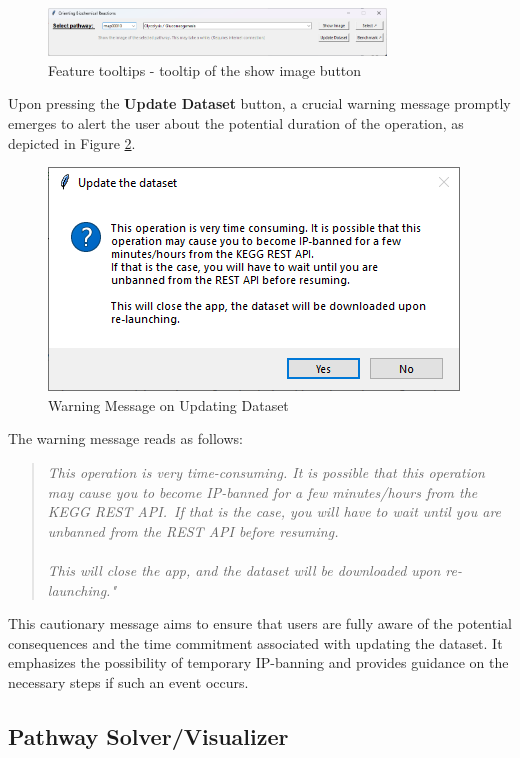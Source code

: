 \begin{figure}[H]
    \centering
    \includegraphics[width=0.8\textwidth]{Design of the User Interface/tip_show_image.png}
    \caption{Feature tooltips - tooltip of the show image button}
    \label{fig:show_image_tooltip}
\end{figure}

Upon pressing the \textbf{Update Dataset} button, a crucial warning message promptly emerges to alert the user about the potential duration of the operation, as depicted in Figure \ref{fig:update_warning}.

\begin{figure} [H]
\centering
\includegraphics[width=0.5\linewidth]{Design of the User Interface/update_warning.png}
\caption{Warning Message on Updating Dataset}
\label{fig:update_warning}
\end{figure}

The warning message reads as follows:

\begin{quote}
\textit{This operation is very time-consuming. It is possible that this operation may cause you to become IP-banned for a few minutes/hours from the KEGG REST API.\
If that is the case, you will have to wait until you are unbanned from the REST API before resuming.\\
\\
This will close the app, and the dataset will be downloaded upon re-launching."}
\end{quote}

This cautionary message aims to ensure that users are fully aware of the potential consequences and the time commitment associated with updating the dataset. It emphasizes the possibility of temporary IP-banning and provides guidance on the necessary steps if such an event occurs.

\subsection{Pathway Solver/Visualizer}

